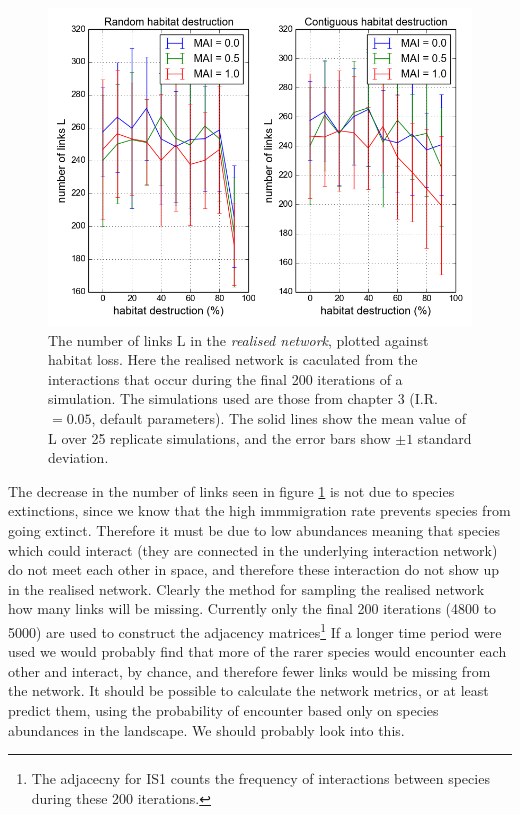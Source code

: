 \begin{figure}

	\centering
	\includegraphics[width=\textwidth]{"L_v_HL_sdj5000"}
	\caption{The number of links L in the \emph{realised network}, plotted against habitat loss. Here the realised network is caculated from the interactions that occur during the final 200 iterations of a simulation. The simulations used are those from chapter 3 (I.R.$=0.05$, default parameters). The solid lines show the mean value of L over 25 replicate simulations, and the error bars show $\pm 1$ standard deviation.}
	\label{fig:sdj}
\end{figure}

The decrease in the number of links seen in figure \ref{fig:sdj} is not due to species extinctions, since we know that the high immmigration rate prevents species from going extinct. Therefore it must be due to low abundances meaning that species which could interact (they are connected in the underlying interaction network) do not meet each other in space, and therefore these interaction do not show up in the realised network. Clearly the method for sampling the realised network how many links will be missing. Currently only the final 200 iterations (4800 to 5000) are used to construct the adjacency matrices\footnote{The adjacecny for IS1 counts the frequency of interactions between species during these 200 iterations.} If a longer time period were used we would probably find that more of the rarer species would encounter each other and interact, by chance, and therefore fewer links would be missing from the network. It should be possible to calculate the network metrics, or at least predict them, using the probability of encounter based only on species abundances in the landscape. We should probably look into this.

